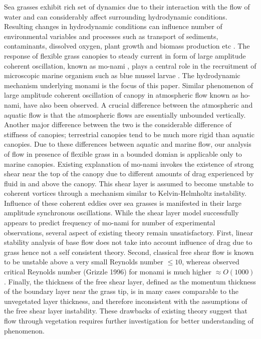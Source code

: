 \documentclass[aps,prl,twocolumn,showpacs,superscriptaddress,groupedaddress,10pt]{revtex4-1}  %
\begin{document}
Sea grasses exhibit rich set of dynamics due to their interaction with the flow of water and can considerably affect surrounding hydrodynamic conditions.
Resulting changes in hydrodynamic conditions can influence number of environmental variables and processes such as 
transport of sediments, contaminants, dissolved oxygen, plant growth and biomass production etc \cite{Fonseca87,Nepf99}. 
The response of flexible grass canopies to steady current in form of large amplitude coherent oscillation, known as mo-nami \cite{AckermanOkubo93}, plays a central role
in the recruitment of microscopic marine organism such as blue mussel larvae \cite{Grizzle96}. The hydrodynamic mechanism underlying monami is the focus of this paper. 
\newline
Similar phenomenon of large amplitude coherent oscillation of canopy in atmospheric flow known as ho-nami\cite{Inoue56,Raupach96}, have also been observed.
A crucial difference between the atmospheric and aquatic flow is that the atmospheric flows are essentially unbounded vertically. Another major
difference between the two is the considerable difference of stiffness of canopies; terrestrial canopies tend to be much more rigid than aquatic canopies.
Due to these differences between aquatic and marine flow, our analysis of flow in presence of flexible grass in a bounded domian is applicable only to marine canopies. 
\newline   
Existing explanation of mo-nami invokes the existence of strong shear near the top of the canopy \cite{Ghisal02,Raupach96} due to
different amounts of drag experienced by fluid in and above the canopy. This shear layer is assumed to become unstable to coherent vortices through a mechanism similar to 
Kelvin-Helmholtz instability. Influence of these coherent eddies over sea grasses is manifested in their large amplitude synchronous oscillations.
\newline
While the shear layer model successfully appears to predict frequency of mo-nami for number of experimental observations, several aspect of existing theory remain unsatisfactory. First, linear stability analysis of base flow does not take into account influence of drag due to grass hence not a self consistent theory. Second, classical free shear flow is known to be unstable above a very small Reynolds number $\leq 10 $, whereas observed critical Reynolds number\cite{Grizzle96} (Grizzle 1996) for monami is much higher $\approx O(1000)$. Finally, the thickness of the free shear layer, defined as the momentum thickness of the boundary layer near the grass tip, is in many cases comparable to the unvegetated layer thickness, and therefore inconsistent with the assumptions of the free shear layer instability. These drawbacks of existing theory suggest that flow through vegetation requires further investigation for better understanding of phenomenon.
\end{document}
